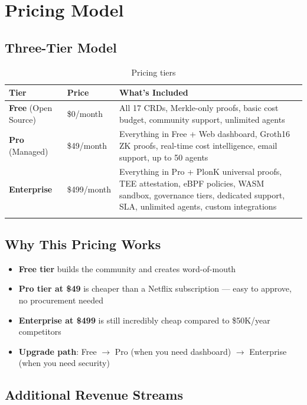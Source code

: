 \documentclass[12pt,a4paper,openany]{report}
\begin{document}
\chapter{Pricing Model}

\section{Three-Tier Model}

\begin{longtable}{p{3cm}p{2.5cm}p{8cm}}
\toprule
\textbf{Tier} & \textbf{Price} & \textbf{What's Included} \\
\midrule
\textbf{Free} (Open Source) & \$0/month & All 17 CRDs, Merkle-only proofs, basic cost budget, community support, unlimited agents \\
\midrule
\textbf{Pro} (Managed) & \$49/month & Everything in Free + Web dashboard, Groth16 ZK proofs, real-time cost intelligence, email support, up to 50 agents \\
\midrule
\textbf{Enterprise} & \$499/month & Everything in Pro + PlonK universal proofs, TEE attestation, eBPF policies, WASM sandbox, governance tiers, dedicated support, SLA, unlimited agents, custom integrations \\
\bottomrule
\caption{Pricing tiers}
\end{longtable}

\section{Why This Pricing Works}

\begin{itemize}
    \item \textbf{Free tier} builds the community and creates word-of-mouth
    \item \textbf{Pro tier at \$49} is cheaper than a Netflix subscription — easy to approve, no procurement needed
    \item \textbf{Enterprise at \$499} is still incredibly cheap compared to \$50K/year competitors
    \item \textbf{Upgrade path}: Free $\rightarrow$ Pro (when you need dashboard) $\rightarrow$ Enterprise (when you need security)
\end{itemize}

\section{Additional Revenue Streams}
\end{document}
